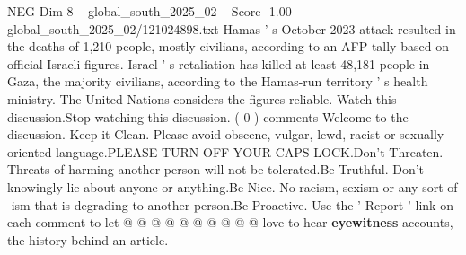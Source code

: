 \begin{textsample}{NEG Dim 8 – global\_south\_2025\_02 – Score -1.00 – global\_south\_2025\_02/121024898.txt}
Hamas ' s October 2023 attack resulted in the deaths of 1,210 people, mostly civilians, according to an AFP tally based on official Israeli figures.
Israel ' s retaliation has killed at least 48,181 people in Gaza, the majority civilians, according to the Hamas-run territory ' s health ministry.
The United Nations considers the figures reliable.
Watch this discussion.Stop watching this discussion. ( 0 ) comments Welcome to the discussion.
Keep it Clean.
Please avoid obscene, vulgar, lewd, racist or sexually-oriented language.PLEASE TURN OFF YOUR CAPS LOCK.Don't Threaten.
Threats of harming another person will not be tolerated.Be Truthful.
Don't knowingly lie about anyone or anything.Be Nice.
No racism, sexism or any sort of -ism that is degrading to another person.Be Proactive.
Use the ' Report ' link on each comment to let @ @ @ @ @ @ @ @ @ @ love to hear \textbf{eyewitness} accounts, the history behind an article.

\end{textsample}
